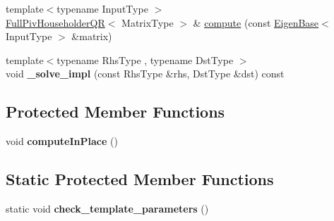 \begin{DoxyCompactItemize}
\item 
{\footnotesize template$<$typename Input\+Type $>$ }\\\mbox{\hyperlink{class_eigen_1_1_full_piv_householder_q_r}{Full\+Piv\+Householder\+QR}}$<$ Matrix\+Type $>$ \& \mbox{\hyperlink{class_eigen_1_1_full_piv_householder_q_r_a3745d70b826c12d33b8d34f26a5c96e7}{compute}} (const \mbox{\hyperlink{struct_eigen_1_1_eigen_base}{Eigen\+Base}}$<$ Input\+Type $>$ \&matrix)
\item 
\mbox{\label{class_eigen_1_1_full_piv_householder_q_r_aa108b4d779b9c131359a542b0850a137}} 
{\footnotesize template$<$typename Rhs\+Type , typename Dst\+Type $>$ }\\void {\bfseries \+\_\+solve\+\_\+impl} (const Rhs\+Type \&rhs, Dst\+Type \&dst) const
\end{DoxyCompactItemize}
\subsection*{Protected Member Functions}
\begin{DoxyCompactItemize}
\item 
\mbox{\label{class_eigen_1_1_full_piv_householder_q_r_a813e30375adb7cc8972aa831d9792a83}} 
void {\bfseries compute\+In\+Place} ()
\end{DoxyCompactItemize}
\subsection*{Static Protected Member Functions}
\begin{DoxyCompactItemize}
\item 
\mbox{\label{class_eigen_1_1_full_piv_householder_q_r_aac6705b86a79ec4998a26da5b3722ac5}} 
static void {\bfseries check\+\_\+template\+\_\+parameters} ()
\end{DoxyCompactItemize}
